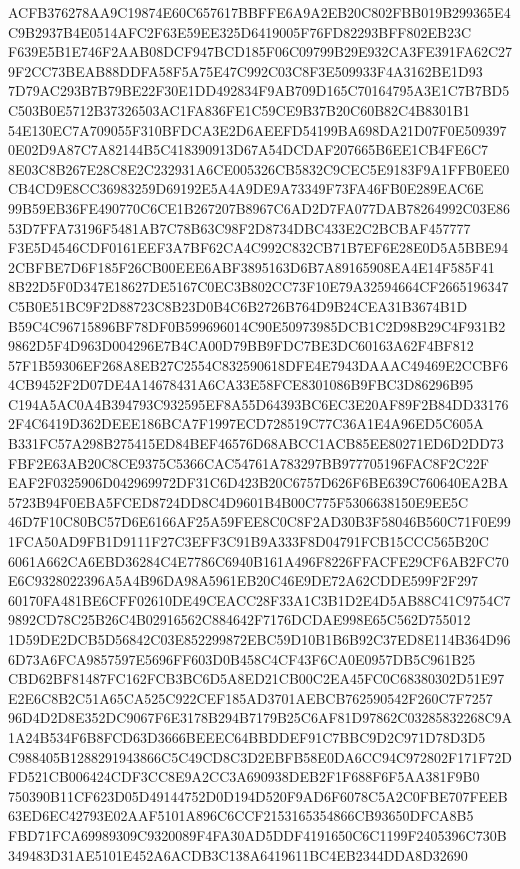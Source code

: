 \documentclass[UTF8,fontset=fandol,zihao=-4,a4paper]{ctexart}
\begin{document}
{{ACFB376278AA9C19874E60C657617BBFFE6A9A2EB20C802FBB019B299365E4C9B2937B4E0514AFC2F63E59EE325D6419005F76FD82293BFF802EB23C
F639E5B1E746F2AAB08DCF947BCD185F06C09799B29E932CA3FE391FA62C279F2CC73BEAB88DDFA58F5A75E47C992C03C8F3E509933F4A3162BE1D93
7D79AC293B7B79BE22F30E1DD492834F9AB709D165C70164795A3E1C7B7BD5C503B0E5712B37326503AC1FA836FE1C59CE9B37B20C60B82C4B8301B1
54E130EC7A709055F310BFDCA3E2D6AEEFD54199BA698DA21D07F0E5093970E02D9A87C7A82144B5C418390913D67A54DCDAF207665B6EE1CB4FE6C7
8E03C8B267E28C8E2C232931A6CE005326CB5832C9CEC5E9183F9A1FFB0EE0CB4CD9E8CC36983259D69192E5A4A9DE9A73349F73FA46FB0E289EAC6E
99B59EB36FE490770C6CE1B267207B8967C6AD2D7FA077DAB78264992C03E8653D7FFA73196F5481AB7C78B63C98F2D8734DBC433E2C2BCBAF457777
F3E5D4546CDF0161EEF3A7BF62CA4C992C832CB71B7EF6E28E0D5A5BBE942CBFBE7D6F185F26CB00EEE6ABF3895163D6B7A89165908EA4E14F585F41
8B22D5F0D347E18627DE5167C0EC3B802CC73F10E79A32594664CF2665196347C5B0E51BC9F2D88723C8B23D0B4C6B2726B764D9B24CEA31B3674B1D
B59C4C96715896BF78DF0B599696014C90E50973985DCB1C2D98B29C4F931B29862D5F4D963D004296E7B4CA00D79BB9FDC7BE3DC60163A62F4BF812
57F1B59306EF268A8EB27C2554C832590618DFE4E7943DAAAC49469E2CCBF64CB9452F2D07DE4A14678431A6CA33E58FCE8301086B9FBC3D86296B95
C194A5AC0A4B394793C932595EF8A55D64393BC6EC3E20AF89F2B84DD331762F4C6419D362DEEE186BCA7F1997ECD728519C77C36A1E4A96ED5C605A
B331FC57A298B275415ED84BEF46576D68ABCC1ACB85EE80271ED6D2DD73FBF2E63AB20C8CE9375C5366CAC54761A783297BB977705196FAC8F2C22F
EAF2F0325906D042969972DF31C6D423B20C6757D626F6BE639C760640EA2BA5723B94F0EBA5FCED8724DD8C4D9601B4B00C775F5306638150E9EE5C
46D7F10C80BC57D6E6166AF25A59FEE8C0C8F2AD30B3F58046B560C71F0E991FCA50AD9FB1D9111F27C3EFF3C91B9A333F8D04791FCB15CCC565B20C
6061A662CA6EBD36284C4E7786C6940B161A496F8226FFACFE29CF6AB2FC70E6C9328022396A5A4B96DA98A5961EB20C46E9DE72A62CDDE599F2F297
60170FA481BE6CFF02610DE49CEACC28F33A1C3B1D2E4D5AB88C41C9754C79892CD78C25B26C4B02916562C884642F7176DCDAE998E65C562D755012
1D59DE2DCB5D56842C03E852299872EBC59D10B1B6B92C37ED8E114B364D966D73A6FCA9857597E5696FF603D0B458C4CF43F6CA0E0957DB5C961B25
CBD62BF81487FC162FCB3BC6D5A8ED21CB00C2EA45FC0C68380302D51E97E2E6C8B2C51A65CA525C922CEF185AD3701AEBCB762590542F260C7F7257
96D4D2D8E352DC9067F6E3178B294B7179B25C6AF81D97862C03285832268C9A1A24B534F6B8FCD63D3666BEEEC64BBDDEF91C7BBC9D2C971D78D3D5
C988405B1288291943866C5C49CD8C3D2EBFB58E0DA6CC94C972802F171F72DFD521CB006424CDF3CC8E9A2CC3A690938DEB2F1F688F6F5AA381F9B0
750390B11CF623D05D49144752D0D194D520F9AD6F6078C5A2C0FBE707FEEB63ED6EC42793E02AAF5101A896C6CCF2153165354866CB93650DFCA8B5
FBD71FCA69989309C9320089F4FA30AD5DDF4191650C6C1199F2405396C730B349483D31AE5101E452A6ACDB3C138A6419611BC4EB2344DDA8D32690
}}
\end{document}
